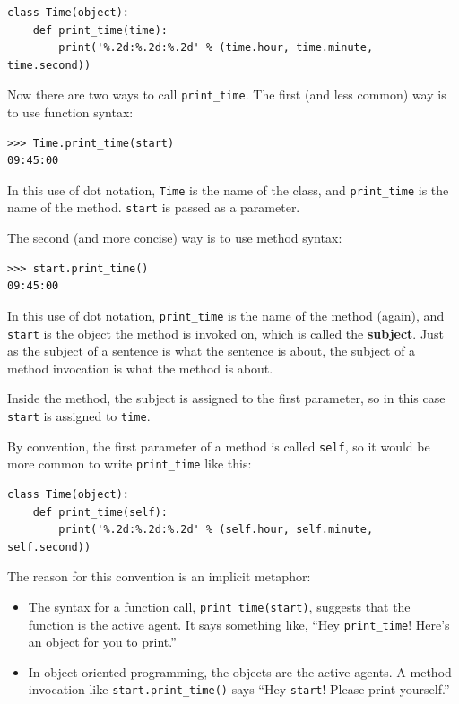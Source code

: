 \documentclass[10pt]{book}
\begin{document}

\beforeverb
\begin{verbatim}
class Time(object):
    def print_time(time):
        print('%.2d:%.2d:%.2d' % (time.hour, time.minute, time.second))
\end{verbatim}
\afterverb
%
Now there are two ways to call \verb"print_time".  The first
(and less common) way is to use function syntax:



\beforeverb
\begin{verbatim}
>>> Time.print_time(start)
09:45:00
\end{verbatim}
\afterverb
%
In this use of dot notation, {\tt Time} is the name of the class,
and \verb"print_time" is the name of the method.  {\tt start} is
passed as a parameter.

The second (and more concise) way is to use method syntax:


\beforeverb
\begin{verbatim}
>>> start.print_time()
09:45:00
\end{verbatim}
\afterverb
%
In this use of dot notation, \verb"print_time" is the name of the
method (again), and {\tt start} is the object the method is
invoked on, which is called the {\bf subject}.  Just as the
subject of a sentence is what the sentence is about, the subject
of a method invocation is what the method is about.


Inside the method, the subject is assigned to the first
parameter, so in this case {\tt start} is assigned
to {\tt time}.


By convention, the first parameter of a method is
called {\tt self}, so it would be more common to write
\verb"print_time" like this:

\beforeverb
\begin{verbatim}
class Time(object):
    def print_time(self):
        print('%.2d:%.2d:%.2d' % (self.hour, self.minute, self.second))
\end{verbatim}
\afterverb
%
The reason for this convention is an implicit metaphor:


\begin{itemize}

\item The syntax for a function call, \verb"print_time(start)",
  suggests that the function is the active agent.  It says something
  like, ``Hey \verb"print_time"!  Here's an object for you to print.''

\item In object-oriented programming, the objects are the active
  agents.  A method invocation like \verb"start.print_time()" says
  ``Hey {\tt start}!  Please print yourself.''

\end{itemize}
\end{document}
